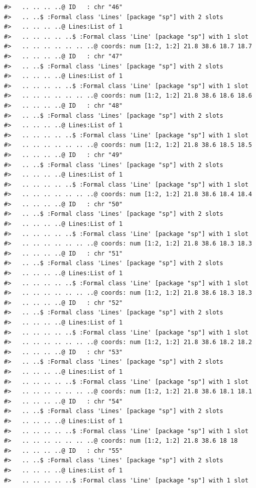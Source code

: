 \documentclass[12pt,a4paper,a4paper]{book}
\theoremstyle{definition}
\theoremstyle{definition}
\theoremstyle{definition}
\theoremstyle{remark}
\begin{document}
\begin{verbatim}
#>   .. .. .. ..@ ID   : chr "46"
#>   .. ..$ :Formal class 'Lines' [package "sp"] with 2 slots
#>   .. .. .. ..@ Lines:List of 1
#>   .. .. .. .. ..$ :Formal class 'Line' [package "sp"] with 1 slot
#>   .. .. .. .. .. .. ..@ coords: num [1:2, 1:2] 21.8 38.6 18.7 18.7
#>   .. .. .. ..@ ID   : chr "47"
#>   .. ..$ :Formal class 'Lines' [package "sp"] with 2 slots
#>   .. .. .. ..@ Lines:List of 1
#>   .. .. .. .. ..$ :Formal class 'Line' [package "sp"] with 1 slot
#>   .. .. .. .. .. .. ..@ coords: num [1:2, 1:2] 21.8 38.6 18.6 18.6
#>   .. .. .. ..@ ID   : chr "48"
#>   .. ..$ :Formal class 'Lines' [package "sp"] with 2 slots
#>   .. .. .. ..@ Lines:List of 1
#>   .. .. .. .. ..$ :Formal class 'Line' [package "sp"] with 1 slot
#>   .. .. .. .. .. .. ..@ coords: num [1:2, 1:2] 21.8 38.6 18.5 18.5
#>   .. .. .. ..@ ID   : chr "49"
#>   .. ..$ :Formal class 'Lines' [package "sp"] with 2 slots
#>   .. .. .. ..@ Lines:List of 1
#>   .. .. .. .. ..$ :Formal class 'Line' [package "sp"] with 1 slot
#>   .. .. .. .. .. .. ..@ coords: num [1:2, 1:2] 21.8 38.6 18.4 18.4
#>   .. .. .. ..@ ID   : chr "50"
#>   .. ..$ :Formal class 'Lines' [package "sp"] with 2 slots
#>   .. .. .. ..@ Lines:List of 1
#>   .. .. .. .. ..$ :Formal class 'Line' [package "sp"] with 1 slot
#>   .. .. .. .. .. .. ..@ coords: num [1:2, 1:2] 21.8 38.6 18.3 18.3
#>   .. .. .. ..@ ID   : chr "51"
#>   .. ..$ :Formal class 'Lines' [package "sp"] with 2 slots
#>   .. .. .. ..@ Lines:List of 1
#>   .. .. .. .. ..$ :Formal class 'Line' [package "sp"] with 1 slot
#>   .. .. .. .. .. .. ..@ coords: num [1:2, 1:2] 21.8 38.6 18.3 18.3
#>   .. .. .. ..@ ID   : chr "52"
#>   .. ..$ :Formal class 'Lines' [package "sp"] with 2 slots
#>   .. .. .. ..@ Lines:List of 1
#>   .. .. .. .. ..$ :Formal class 'Line' [package "sp"] with 1 slot
#>   .. .. .. .. .. .. ..@ coords: num [1:2, 1:2] 21.8 38.6 18.2 18.2
#>   .. .. .. ..@ ID   : chr "53"
#>   .. ..$ :Formal class 'Lines' [package "sp"] with 2 slots
#>   .. .. .. ..@ Lines:List of 1
#>   .. .. .. .. ..$ :Formal class 'Line' [package "sp"] with 1 slot
#>   .. .. .. .. .. .. ..@ coords: num [1:2, 1:2] 21.8 38.6 18.1 18.1
#>   .. .. .. ..@ ID   : chr "54"
#>   .. ..$ :Formal class 'Lines' [package "sp"] with 2 slots
#>   .. .. .. ..@ Lines:List of 1
#>   .. .. .. .. ..$ :Formal class 'Line' [package "sp"] with 1 slot
#>   .. .. .. .. .. .. ..@ coords: num [1:2, 1:2] 21.8 38.6 18 18
#>   .. .. .. ..@ ID   : chr "55"
#>   .. ..$ :Formal class 'Lines' [package "sp"] with 2 slots
#>   .. .. .. ..@ Lines:List of 1
#>   .. .. .. .. ..$ :Formal class 'Line' [package "sp"] with 1 slot

\end{verbatim}
\end{document}
